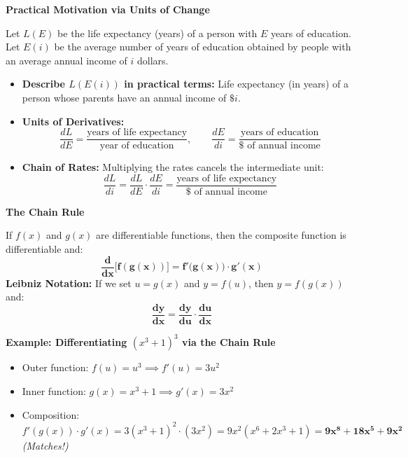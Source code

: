 \documentclass[10.5pt]{article}
\begin{document}
\vspace{0.03in}

\textbf{\large Practical Motivation via Units of Change}

Let $L(E)$ be the life expectancy (years) of a person with $E$ years of education. Let $E(i)$ be the average number of years of education obtained by people with an average annual income of $i$ dollars.

\begin{itemize}[leftmargin=1.2em, topsep=1pt, itemsep=2pt]
  \item \textbf{Describe $L(E(i))$ in practical terms:} Life expectancy (in years) of a person whose parents have an annual income of $\$i$.
  \item \textbf{Units of Derivatives:}
  \[
    \frac{dL}{dE} = \frac{\text{years of life expectancy}}{\text{year of education}}, \qquad \frac{dE}{di} = \frac{\text{years of education}}{\$ \text{ of annual income}}
  \]
  \item \textbf{Chain of Rates:} Multiplying the rates cancels the intermediate unit:
  \[
    \frac{dL}{di} = \frac{dL}{dE} \cdot \frac{dE}{di} = \frac{\text{years of life expectancy}}{\$ \text{ of annual income}}
  \]
\end{itemize}

\vspace{0.03in}

\begin{tcolorbox}[colback=chalkblue!6, colframe=chalkblue, boxrule=1pt, arc=3pt, left=8pt, right=8pt, top=4pt, bottom=4pt]
\textbf{\large The Chain Rule}
\vspace{1pt}

If $f(x)$ and $g(x)$ are differentiable functions, then the composite function is differentiable and:
\[
  \mathbf{\frac{d}{dx}\big[f(g(x))\big] = f'\big(g(x)\big) \cdot g'(x)}
\]
\textbf{Leibniz Notation:} If we set $u = g(x)$ and $y = f(u)$, then $y = f(g(x))$ and:
\[
  \mathbf{\frac{dy}{dx} = \frac{dy}{du} \cdot \frac{du}{dx}}
\]
\end{tcolorbox}

\vspace{0.02in}

\textbf{Example: Differentiating $(x^3 + 1)^3$ via the Chain Rule}
\begin{itemize}[leftmargin=1.2em, label=$\bullet$, topsep=1pt, itemsep=2pt]
  \item Outer function: $f(u) = u^3 \implies f'(u) = 3u^2$
  \item Inner function: $g(x) = x^3 + 1 \implies g'(x) = 3x^2$
  \item Composition: $f'(g(x)) \cdot g'(x) = 3(x^3 + 1)^2 \cdot (3x^2) = 9x^2(x^6 + 2x^3 + 1) = \mathbf{9x^8 + 18x^5 + 9x^2}$ \quad \textit{(Matches!)}
\end{itemize}
\end{document}
